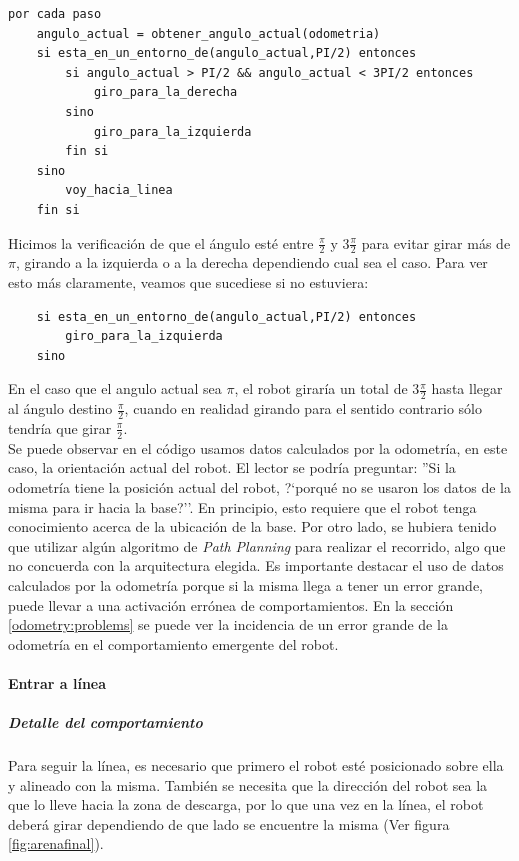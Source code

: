 \begin{verbatim}
por cada paso
    angulo_actual = obtener_angulo_actual(odometria)
    si esta_en_un_entorno_de(angulo_actual,PI/2) entonces
        si angulo_actual > PI/2 && angulo_actual < 3PI/2 entonces
            giro_para_la_derecha
        sino
            giro_para_la_izquierda
        fin si
    sino
        voy_hacia_linea
    fin si
\end{verbatim}

Hicimos la verificaci\'on de que el \'angulo est\'e entre $\frac{\pi}{2}$ y $3\frac{\pi}{2}$
para evitar girar m\'as de $\pi$, girando a la izquierda o a la derecha dependiendo
cual sea el caso. Para ver esto m\'as claramente, veamos que sucediese si no estuviera:
\begin{verbatim}
    si esta_en_un_entorno_de(angulo_actual,PI/2) entonces
        giro_para_la_izquierda
    sino
\end{verbatim}
En el caso que el angulo actual sea $\pi$, el robot girar\'ia un total de $3\frac{\pi}{2}$
hasta llegar al \'angulo destino $\frac{\pi}{2}$, cuando en realidad girando para el sentido
contrario s\'olo tendr\'ia que girar $\frac{\pi}{2}$.
\\
Se puede observar en el c\'odigo usamos datos calculados por la odometr\'ia, en
este caso, la orientaci\'on actual del robot. El lector se podr\'ia preguntar:
''Si la odometr\'ia tiene la posici\'on actual del robot, ?`porqu\'e no se usaron los datos
de la misma para ir hacia la base?''. En principio, esto requiere que el robot tenga
conocimiento acerca de la ubicaci\'on de la base. Por otro lado, se hubiera tenido que utilizar
alg\'un algoritmo de \emph{Path Planning} para realizar el recorrido, algo que no
concuerda con la arquitectura elegida.
Es importante destacar el uso de datos calculados por la odometr\'ia porque si la misma
llega a tener un error grande, puede llevar a una activaci\'on err\'onea de comportamientos.
En la secci\'on \ref{odometry:problems} se puede ver la incidencia de un error grande de
la odometr\'ia en el comportamiento emergente del robot.

\paragraph{Entrar a l\'inea}
\label{enter_line}
\subparagraph{Detalle del comportamiento}

Para seguir la l\'inea, es necesario que primero el robot est\'e posicionado sobre ella
y alineado con la misma. Tambi\'en se necesita que la direcci\'on del robot sea la que
lo lleve hacia la zona de descarga, por lo que una vez en la l\'inea, el robot deber\'a
girar dependiendo de que lado se encuentre la misma (Ver figura \ref{fig:arenafinal}).

